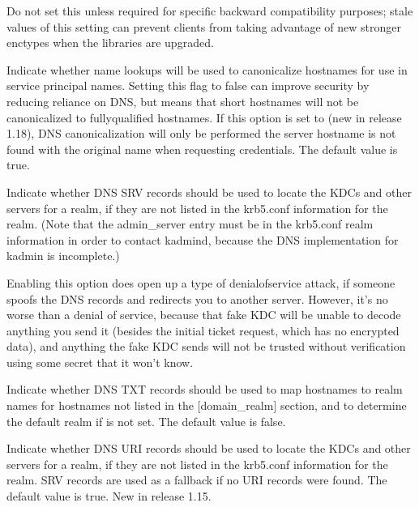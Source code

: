 \documentclass[letterpaper,10pt,english]{sphinxmanual}
\begin{document}
\begin{description}
\sphinxAtStartPar
Do not set this unless required for specific backward
compatibility purposes; stale values of this setting can prevent
clients from taking advantage of new stronger enctypes when the
libraries are upgraded.

\sphinxAtStartPar
Indicate whether name lookups will be used to canonicalize
hostnames for use in service principal names.  Setting this flag
to false can improve security by reducing reliance on DNS, but
means that short hostnames will not be canonicalized to
fully\sphinxhyphen{}qualified hostnames.  If this option is set to  (new
in release 1.18), DNS canonicalization will only be performed the
server hostname is not found with the original name when
requesting credentials.  The default value is true.

\sphinxAtStartPar
Indicate whether DNS SRV records should be used to locate the KDCs
and other servers for a realm, if they are not listed in the
krb5.conf information for the realm.  (Note that the admin\_server
entry must be in the krb5.conf realm information in order to
contact kadmind, because the DNS implementation for kadmin is
incomplete.)

\sphinxAtStartPar
Enabling this option does open up a type of denial\sphinxhyphen{}of\sphinxhyphen{}service
attack, if someone spoofs the DNS records and redirects you to
another server.  However, it’s no worse than a denial of service,
because that fake KDC will be unable to decode anything you send
it (besides the initial ticket request, which has no encrypted
data), and anything the fake KDC sends will not be trusted without
verification using some secret that it won’t know.

\sphinxAtStartPar
Indicate whether DNS TXT records should be used to map hostnames
to realm names for hostnames not listed in the {[}domain\_realm{]}
section, and to determine the default realm if 
is not set.  The default value is false.

\sphinxAtStartPar
Indicate whether DNS URI records should be used to locate the KDCs
and other servers for a realm, if they are not listed in the
krb5.conf information for the realm.  SRV records are used as a
fallback if no URI records were found.  The default value is true.
New in release 1.15.


\end{description}
\end{document}
